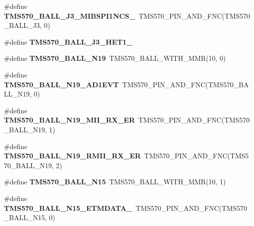 \begin{DoxyCompactItemize}
\mbox{\label{tms570ls3137zwt-pins_8h_ab1ba90a63d17835f35b5a9de591ec862}} 
\#define {\bfseries T\+M\+S570\+\_\+\+B\+A\+L\+L\+\_\+\+J3\+\_\+\+M\+I\+B\+S\+P\+I1\+N\+C\+S\+\_}~T\+M\+S570\+\_\+\+P\+I\+N\+\_\+\+A\+N\+D\+\_\+\+F\+NC(T\+M\+S570\+\_\+\+B\+A\+L\+L\+\_\+\+J3, 0)
\item 
\#define {\bfseries T\+M\+S570\+\_\+\+B\+A\+L\+L\+\_\+\+J3\+\_\+\+H\+E\+T1\+\_}
\item 
\mbox{\label{tms570ls3137zwt-pins_8h_aadbe02e15a0512330eebe0fd50393980}} 
\#define {\bfseries T\+M\+S570\+\_\+\+B\+A\+L\+L\+\_\+\+N19}~T\+M\+S570\+\_\+\+B\+A\+L\+L\+\_\+\+W\+I\+T\+H\+\_\+\+M\+MR(10, 0)
\item 
\mbox{\label{tms570ls3137zwt-pins_8h_a2135454ed5b9c5957934919c06ed57cf}} 
\#define {\bfseries T\+M\+S570\+\_\+\+B\+A\+L\+L\+\_\+\+N19\+\_\+\+A\+D1\+E\+VT}~T\+M\+S570\+\_\+\+P\+I\+N\+\_\+\+A\+N\+D\+\_\+\+F\+NC(T\+M\+S570\+\_\+\+B\+A\+L\+L\+\_\+\+N19, 0)
\item 
\mbox{\label{tms570ls3137zwt-pins_8h_a71239cd97ac84399167a0c6f04ab8c04}} 
\#define {\bfseries T\+M\+S570\+\_\+\+B\+A\+L\+L\+\_\+\+N19\+\_\+\+M\+I\+I\+\_\+\+R\+X\+\_\+\+ER}~T\+M\+S570\+\_\+\+P\+I\+N\+\_\+\+A\+N\+D\+\_\+\+F\+NC(T\+M\+S570\+\_\+\+B\+A\+L\+L\+\_\+\+N19, 1)
\item 
\mbox{\label{tms570ls3137zwt-pins_8h_ab3a7bab9d59a176fee9ebdd888dcc0be}} 
\#define {\bfseries T\+M\+S570\+\_\+\+B\+A\+L\+L\+\_\+\+N19\+\_\+\+R\+M\+I\+I\+\_\+\+R\+X\+\_\+\+ER}~T\+M\+S570\+\_\+\+P\+I\+N\+\_\+\+A\+N\+D\+\_\+\+F\+NC(T\+M\+S570\+\_\+\+B\+A\+L\+L\+\_\+\+N19, 2)
\item 
\mbox{\label{tms570ls3137zwt-pins_8h_a7690b53a678030ae1d9fc5711f084c4e}} 
\#define {\bfseries T\+M\+S570\+\_\+\+B\+A\+L\+L\+\_\+\+N15}~T\+M\+S570\+\_\+\+B\+A\+L\+L\+\_\+\+W\+I\+T\+H\+\_\+\+M\+MR(10, 1)
\item 
\mbox{\label{tms570ls3137zwt-pins_8h_a9f0e54ecc7736b800bb8accf22643c6b}} 
\#define {\bfseries T\+M\+S570\+\_\+\+B\+A\+L\+L\+\_\+\+N15\+\_\+\+E\+T\+M\+D\+A\+T\+A\+\_}~T\+M\+S570\+\_\+\+P\+I\+N\+\_\+\+A\+N\+D\+\_\+\+F\+NC(T\+M\+S570\+\_\+\+B\+A\+L\+L\+\_\+\+N15, 0)

\end{DoxyCompactItemize}
